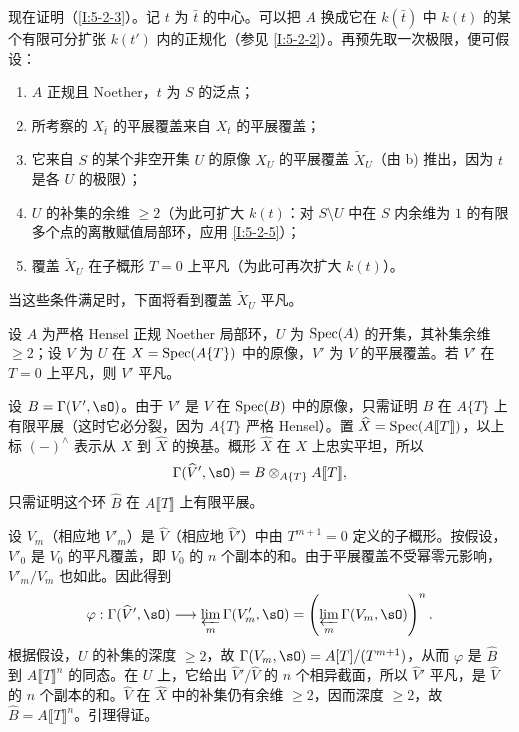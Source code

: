 \subsubsection{}\label{I:5-2-6}
\endgroup
现在证明（\ref{I:5-2-3}）。记 $t$ 为 $\bar t$ 的中心。可以把 $A$ 换成它在 $k(\bar t)$ 中 $k(t)$ 的某个有限可分扩张 $k(t')$ 内的正规化（参见 \ref{I:5-2-2}）。再预先取一次极限，便可假设：
\begin{enumerate}[\indent a)]
\item $A$ 正规且 Noether，$t$ 为 $S$ 的泛点；
\item 所考察的 $X_{\bar t}$ 的平展覆盖来自 $X_t$ 的平展覆盖；
\item 它来自 $S$ 的某个非空开集 $U$ 的原像 $X_U$ 的平展覆盖 $\widetilde X_U$（由 b) 推出，因为 $t$ 是各 $U$ 的极限）；
\item $U$ 的补集的余维 $\geqslant2$（为此可扩大 $k(t)$：对 $S\setminus U$ 中在 $S$ 内余维为 $1$ 的有限多个点的离散赋值局部环，应用 \ref{I:5-2-5}）；
\item 覆盖 $\widetilde X_U$ 在子概形 $T=0$ 上平凡（为此可再次扩大 $k(t)$）。
\end{enumerate}
当这些条件满足时，下面将看到覆盖 $\widetilde X_U$ 平凡。
\begingroup
\renewcommand{\thesubsubsection}{\thesection.\arabic{subsection}.3.4}
\begin{lemma}\label{I:5-2-7}
设 $A$ 为严格 Hensel 正规 Noether 局部环，$U$ 为 $\operatorname{Spec}(A)$ 的开集，其补集余维 $\geqslant2$；设 $V$ 为 $U$ 在 $X=\operatorname{Spec}(A\{T\})$ 中的原像，$V'$ 为 $V$ 的平展覆盖。若 $V'$ 在 $T=0$ 上平凡，则 $V'$ 平凡。
\end{lemma}
\endgroup
设 $B=\Gamma(V',\sO)$。由于 $V'$ 是 $V$ 在 $\operatorname{Spec}(B)$ 中的原像，只需证明 $B$ 在 $A\{T\}$ 上有限平展（这时它必分裂，因为 $A\{T\}$ 严格 Hensel）。置 $\widehat X=\operatorname{Spec}(A\llbracket T\rrbracket)$，以上标 $(-)^\wedge$ 表示从 $X$ 到 $\widehat X$ 的换基。概形 $\widehat X$ 在 $X$ 上忠实平坦，所以
\[
\Gamma(\widehat V',\sO)=B\otimes_{A\{T\}}A\llbracket T\rrbracket,
\]
只需证明这个环 $\widehat B$ 在 $A\llbracket T\rrbracket$ 上有限平展。

设 $V_m$（相应地 $V'_m$）是 $\widehat V$（相应地 $\widehat V'$）中由 $T^{m+1}=0$ 定义的子概形。按假设，$V'_0$ 是 $V_0$ 的平凡覆盖，即 $V_0$ 的 $n$ 个副本的和。由于平展覆盖不受幂零元影响，$V'_m/V_m$ 也如此。因此得到
\[
\varphi:\Gamma(\widehat V',\sO)\longrightarrow\varprojlim_m\Gamma(V'_m,\sO)
=\left(\varprojlim_m\Gamma(V_m,\sO)\right)^n.
\]
根据假设，$U$ 的补集的深度 $\geqslant2$，故 $\Gamma(V_m,\sO)=A[T]/(T^{m+1})$，从而 $\varphi$ 是 $\widehat B$ 到 $A\llbracket T\rrbracket^n$ 的同态。在 $U$ 上，它给出 $\widehat V'/\widehat V$ 的 $n$ 个相异截面，所以 $\widehat V'$ 平凡，是 $\widehat V$ 的 $n$ 个副本的和。$\widehat V$ 在 $\widehat X$ 中的补集仍有余维 $\geqslant2$，因而深度 $\geqslant2$，故 $\widehat B=A\llbracket T\rrbracket^n$。引理得证。

